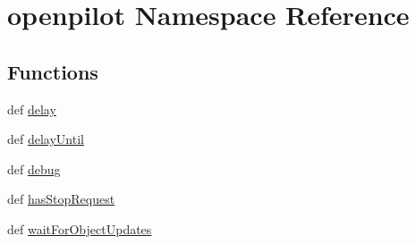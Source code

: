 \hypertarget{namespaceopenpilot}{\section{openpilot Namespace Reference}
\label{namespaceopenpilot}
}
\subsection*{Functions}
\begin{DoxyCompactItemize}
\item 
def \hyperlink{namespaceopenpilot_ab8f7f8df27f540e59e0e42fddb67a4fb}{delay}
\item 
def \hyperlink{namespaceopenpilot_a9eb6d890272febed1ef5f96a3022c08d}{delay\-Until}
\item 
def \hyperlink{namespaceopenpilot_a73e0e8ed950877790185d24208d8a5e7}{debug}
\item 
def \hyperlink{namespaceopenpilot_a04d63804d12a055a648df7b624993199}{has\-Stop\-Request}
\item 
def \hyperlink{namespaceopenpilot_af904576c7f507a9787785a4329f61a25}{wait\-For\-Object\-Updates}
\end{DoxyCompactItemize}


